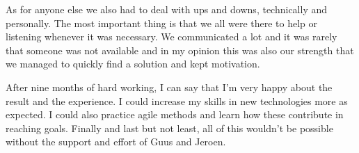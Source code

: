 As for anyone else we also had to deal with ups and downs, technically and
personally. The most important thing is that we all were there to help or
listening whenever it was necessary. We communicated a lot and it was rarely
that someone was not available and in my opinion this was also our strength that
we managed to quickly find a solution and kept motivation.

After nine months of hard working, I can say that I'm very happy about the
result and the experience. I could increase my skills in new technologies more
as expected. I could also practice agile methods and learn how these contribute
in reaching goals. Finally and last but not least, all of this wouldn't be possible
without the support and effort of Guus and Jeroen.
